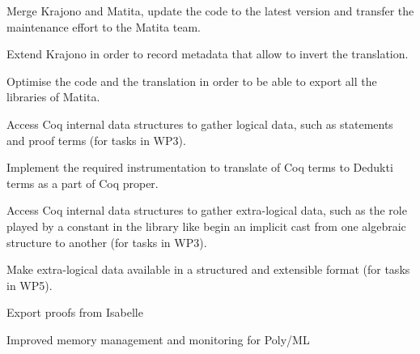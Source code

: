 \begin{workpackage}
\begin{tasklist}
\begin{task}[id=matita,
  title=Integrate the Matita translator in Matita itself,
  shorttitle=Matita,
  lead=Bol,
  BolRM=4,
  wphases=1-12]
\vspace{-5mm}
\begin{compactitem}
\item Merge Krajono and Matita, update the code to the latest
  version and transfer the maintenance effort to the Matita team.
\item Extend Krajono in order to record metadata that allow to
  invert the translation.
\item Optimise the code and the translation in order to be able to
  export all the libraries of Matita.
\end{compactitem}
\end{task}

\begin{task}[id=coq,
  title=Instrument Coq,
  shorttitle=Coq,
  lead=Bol,
  BolRM=12,
  InrRM=6,
  wphases=1-8]
\vspace{-5mm}
\begin{compactitem}
\item Access Coq internal data structures to gather logical data, such as
statements and proof terms (for tasks in WP3).
\item Implement the required instrumentation to translate of Coq terms
to Dedukti terms as a part of Coq proper.
\item Access Coq internal data structures to gather extra-logical data,
such as the role played by a constant in the library like begin an implicit
cast from one algebraic structure to another (for tasks in WP3).
\item Make extra-logical data available in a structured and
  extensible format (for tasks in WP5).
\end{compactitem}
\end{task}
\end{tasklist}

\begin{wpdelivs}

  \begin{wpdeliv}[due=12,miles=isabelle,id=isabelle,dissem=PU,nature=OTHER,lead=Tum,task=isabelle]{Export proofs from Isabelle}\end{wpdeliv}

  \begin{wpdeliv}[due=12,id=isabelleImproved,dissem=PU,nature=OTHER,lead=Tum,task=isabelle]{Improved memory management and monitoring for Poly/ML}\end{wpdeliv}


\end{wpdelivs}
\end{workpackage}

